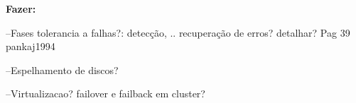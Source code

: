 \textbf{Fazer:} 

--Fases tolerancia a falhas?: detecção, .. recuperação de erros? detalhar? Pag 39 pankaj1994

--Espelhamento de discos?

--Virtualizacao? failover e failback em cluster?

